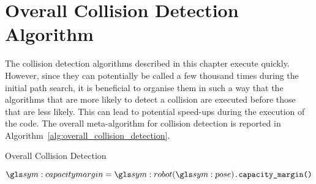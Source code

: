 \section{Overall Collision Detection Algorithm}%
\label{sec:overall_collision_detection_algorithm}

	The collision detection algorithms described in this chapter execute
	quickly. However, since they can potentially be called a few thousand times
	during the initial path search, it is beneficial to organise them in such a
	way that the algorithms that are more likely to detect a collision are
	executed before those that are less likely. This can lead to potential
	speed-ups during the execution  of the code.  The overall meta-algorithm for
	collision detection is reported in
	Algorithm~\ref{alg:overall_collision_detection}.

	\begin{algorithm}[ht]
		\caption{Overall Collision Detection}%
		\label{alg:overall_collision_detection}
		\begin{algorithmic}[1]
				\ForAll{\cable}
					\ForAll{\obstacle}
							\State{}
						\EndIf{}
					\EndFor{}
				\EndFor{}
				\ForAll{\obstacle}
						\State{}
					\EndIf{}
				\EndFor{}
				\ForAll{$\cable_{\indexi}$}
					\ForAll{$\cable_{\indexj} \neq \cable_{\indexi}$}
					 		\State{}
						\EndIf{}
					\EndFor{}
				\EndFor{}
				\ForAll{\cable}
						\State{}
					\EndIf{}
				\EndFor{}
				\State{}$\capacitymargin = \robot(\pose)\code{.capacity\_margin()}$
					\State{}
				\EndIf{}
				\State{}
			\EndProcedure{}
		\end{algorithmic}
	\end{algorithm}
